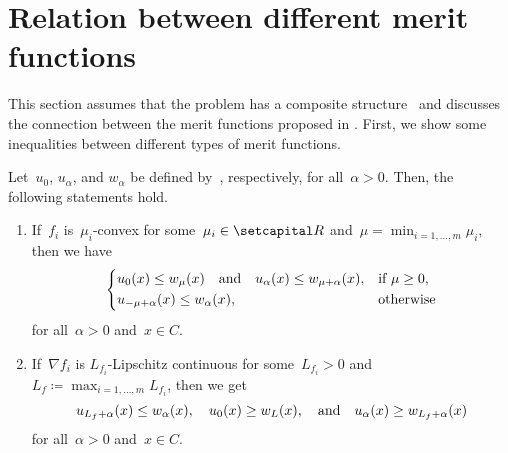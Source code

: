 \documentclass[../main]{subfiles}
\begin{document}
\section{Relation between different merit functions} 
This section assumes that the problem has a composite structure~ and discusses the connection between the merit functions proposed in .
First, we show some inequalities between different types of merit functions.
\begin{theorem} 
    Let~$u_0$, $u_\alpha$, and $w_\alpha$ be defined by~, respectively, for all~$\alpha > 0$.
    Then, the following statements hold.
    \begin{enumerate}
        \item If~$f_i$ is~$\mu_i$-convex for some~$\mu_i \in \setR$ and~$\mu = \min_{i = 1, \dots, m} \mu_i$, then we have
            \begin{equation}
                \begin{dcases}
                    u_0(x) \le w_\mu(x) \quad \text{and} \quad u_\alpha(x) \le w_{\mu + \alpha}(x), & \text{if } \mu \ge 0, \\
                    u_{- \mu + \alpha}(x) \le w_\alpha(x), & \text{otherwise}
                \end{dcases}
            \end{equation}
            for all~$\alpha > 0$ and~$x \in C$. 

        \item If~$\nabla f_i$ is $L_{f_i}$-Lipschitz continuous for some~$L_{f_i} > 0$ and~$L_f \coloneqq \max_{i = 1, \dots, m} L_{f_i}$, then we get
            \begin{equation}
                u_{L_f + \alpha}(x) \le w_\alpha(x), \quad u_0(x) \ge w_L(x), \quad \text{and} \quad u_\alpha(x) \ge w_{L_f + \alpha}(x)
            \end{equation}
            for all~$\alpha > 0$ and~$x \in C$.
    \end{enumerate}
\end{theorem}
\end{document}
